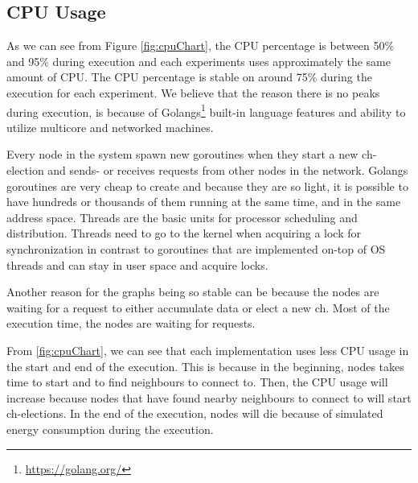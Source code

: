 \documentclass[USenglish]{uit-thesis}
\begin{document}
\newpage

\subsection{CPU Usage}
As we can see from Figure \ref{fig:cpuChart}, the CPU percentage is between 50\% and 95\% during execution and each experiments uses approximately the same amount of CPU.
The CPU percentage is stable on around 75\% during the execution for each experiment. We believe that the reason there is no peaks during execution, is because of Golangs\footnote{\url{https://golang.org/}} built-in language features and ability to utilize multicore and networked machines.

Every node in the system spawn new goroutines when they start a new \gls{ch}-election and sends- or receives requests from other nodes in the network.
Golangs goroutines are very cheap to create and because they are so light, it is possible to have hundreds or thousands of them running at the same time, and in the same address space. Threads are the basic units for processor scheduling and distribution. Threads need to go to the kernel when acquiring a lock for synchronization in contrast to goroutines that are implemented on-top of OS threads and can stay in user space and acquire locks.

Another reason for the graphs being so stable can be because the nodes are waiting for a request to either accumulate data or elect a new \gls{ch}. Most of the execution time, the nodes are waiting for requests.

From \autoref{fig:cpuChart}, we can see that each implementation uses less CPU usage in the start and end of the execution. This is because in the beginning, nodes takes time to start and to find neighbours to connect to. Then, the CPU usage will increase because nodes that have found nearby neighbours to connect to will start \gls{ch}-elections.
In the end of the execution, nodes will die because of simulated energy consumption during the execution.

\end{document}

